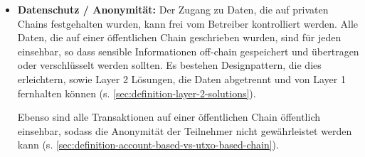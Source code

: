 \begin{itemize}
    \item \textbf{Datenschutz / Anonymität:}
    Der Zugang zu Daten, die auf privaten Chains festgehalten wurden, kann frei vom Betreiber kontrolliert werden. 
    Alle Daten, die auf einer öffentlichen Chain geschrieben wurden, sind für jeden einsehbar, so dass sensible Informationen off-chain gespeichert und übertragen  oder verschlüsselt werden sollten. 
    Es bestehen Designpattern, die dies erleichtern, sowie Layer 2 Lösungen, die Daten abgetrennt und von Layer 1 fernhalten können (s. \ref{sec:definition-layer-2-solutions}).

    Ebenso sind alle Transaktionen auf einer öffentlichen Chain öffentlich einsehbar, sodass die Anonymität der Teilnehmer nicht gewährleistet werden kann (s. \ref{sec:definition-account-based-vs-utxo-based-chain}).
\end{itemize}

